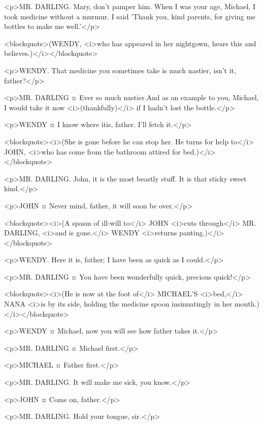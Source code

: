 <p>MR. DARLING. Mary, don't pamper him. When I was your age, Michael, I took medicine without a murmur. I said 'Thank you, kind parents, for giving me bottles to make me well.'</p>

<blockquote>(WENDY, <i>who has appeared in her nightgown, hears this and believes.)</i></blockquote>

<p>WENDY. That medicine you sometimes take is much nastier, isn't it, father?</p>

<p>MR. DARLING ¤
Ever so much nastier.And as an example to you, Michael, I would take it now <i>(thankfully)</i> if I hadn't lost the bottle.</p>

<p>WENDY ¤
I know where itis, father. I'll fetch it.</p>

<blockquote><i>(She is gone before he can stop her. He turns for help to</i> JOHN, <i>who has come from the bathroom attired for bed.)</i></blockquote>

<p>MR. DARLING. John, it is the most beastly stuff. It is that sticky sweet kind.</p>

<p>JOHN ¤
Never mind, father, it will soon be over.</p>

<blockquote><i>(A spasm of ill-will to</i> JOHN <i>cuts through</i> MR. DARLING, <i>and is gone.</i> WENDY <i>returns panting.)</i></blockquote>

<p>WENDY. Here it is, father; I have been as quick as I could.</p>

<p>MR. DARLING ¤
You have been wonderfully quick, precious quick!</p>

<blockquote><i>(He is now at the foot of</i> MICHAEL'S <i>bed,</i> NANA <i>is by its side, holding the medicine spoon insinuatingly in her mouth.)</i></blockquote>

<p>WENDY ¤
Michael, now you will see how father takes it.</p>

<p>MR. DARLING ¤
Michael first.</p>

<p>MICHAEL ¤
Father first.</p>

<p>MR. DARLING. It will make me sick, you know.</p>

<p>JOHN ¤
Come on, father.</p>

<p>MR. DARLING. Hold your tongue, sir.</p>

